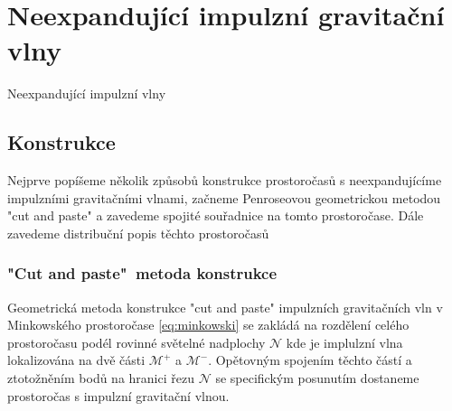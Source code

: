 \chapter{Neexpandující impulzní gravitační vlny}
Neexpandující impulzní vlny 


\section{Konstrukce}
Nejprve popíšeme několik způsobů konstrukce prostoročasů s neexpandujícíme impulzními gravitačními vlnami, začneme Penroseovou \cite{Penrose:1972xrn} geometrickou metodou
"cut and paste" a zavedeme spojité souřadnice na tomto prostoročase. Dále zavedeme distribuční popis těchto prostoročasů

\subsection{"Cut and paste"\ metoda konstrukce}
\label{sec:cut_and_paste_konstrukce1}
Geometrická metoda konstrukce "cut and paste" impulzních gravitačních vln v Minkowského prostoročase \eqref{eq:minkowski} se zakládá na rozdělení celého prostoročasu podél rovinné
světelné nadplochy $\mathcal{N}$ kde je implulzní vlna lokalizována na dvě části $\mathcal{M}^+$ a $\mathcal{M}^-$. Opětovným spojením těchto částí a ztotožněním bodů na hranici
řezu $\mathcal{N}$ se specifickým posunutím dostaneme prostoročas s impulzní gravitační vlnou.

